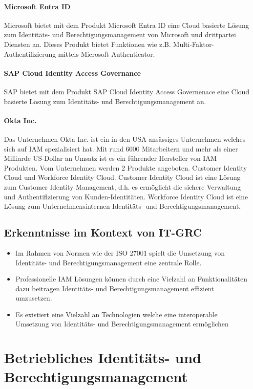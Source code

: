 \documentclass[11pt]{article}
\begin{document}
\paragraph{Microsoft Entra ID}
Microsoft bietet mit dem Produkt \glqq{}Microsoft Entra ID\grqq{} eine Cloud basierte Lösung zum Identitäts- und Berechtigungsmanagement von Microsoft und drittpartei Diensten an. Dieses Produkt bietet Funktionen wie z.B. Multi-Faktor-Authentifizierung mittels Microsoft Authenticator.
\paragraph{SAP Cloud Identity Access Governance}
SAP bietet mit dem Produkt \glqq{}SAP Cloud Identity Access Governenace\grqq{} eine Cloud basierte Lösung zum Identitäts- und Berechtigungsmanagement an.
\paragraph{Okta Inc.}
Das Unternehmen Okta Inc. ist ein in den USA ansässiges Unternehmen welches sich auf IAM spezialisiert hat. Mit rund 6000 Mitarbeitern und mehr als einer Milliarde US-Dollar an Umsatz ist es ein führender Hersteller von IAM Produkten. Vom Unternehmen werden 2 Produkte angeboten. Customer Identity Cloud und Workforce Identity Cloud. Customer Identity Cloud ist eine Lösung zum Customer Identity Management, d.h. es ermöglicht die sichere Verwaltung und Authentifizierung von Kunden-Identitäten. Workforce Identity Cloud ist eine Lösung zum Unternehmensinternen Identitäts- und Berechtigungsmanagement.
\subsection{Erkenntnisse im Kontext von IT-GRC}
\begin{itemize}
  \item Im Rahmen von Normen wie der ISO 27001 spielt die Umsetzung von Identitäts- und Berechtigungsmanagement eine zentrale Rolle.
  \item Professionelle IAM Lösungen können durch eine Vielzahl an Funktionalitäten dazu beitragen Identitäts- und Berechtigungsmanagement effizient umzusetzen.
  \item Es existiert eine Vielzahl an Technologien welche eine interoperable Umsetzung von Identitäts- und Berechtigungsmanagement ermöglichen
\end{itemize}
\section{Betriebliches Identitäts- und Berechtigungsmanagement}
\label{sec:betrieb}
\end{document}
